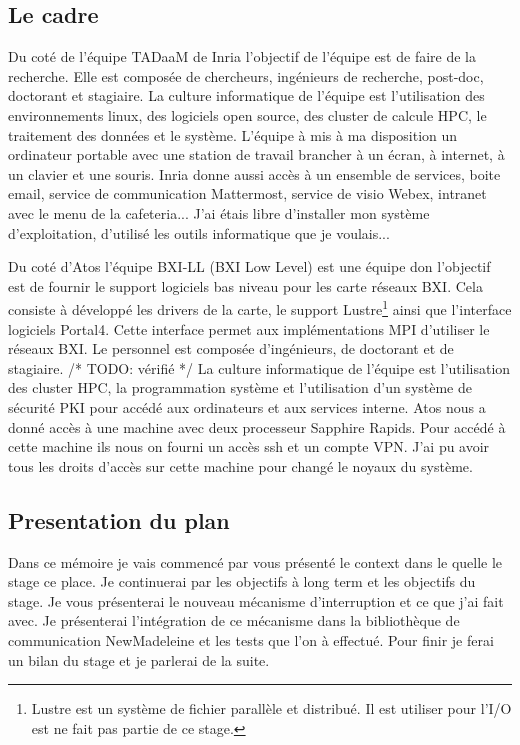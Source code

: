 \subsection{Le cadre}

Du coté de l'équipe TADaaM de Inria l'objectif de l'équipe est de faire de la recherche.
Elle est composée de chercheurs, ingénieurs de recherche, post-doc, doctorant et stagiaire.
La culture informatique de l'équipe est l'utilisation des environnements linux, des logiciels open source,
des cluster de calcule HPC, le traitement des données et le système.
L'équipe à mis à ma disposition un ordinateur portable avec une station de travail brancher à un écran, à internet, à un clavier et une souris.
Inria donne aussi accès à un ensemble de services, boite email, service de communication Mattermost, service de visio Webex, intranet avec le menu de la cafeteria...
J'ai étais libre d'installer mon système d'exploitation, d'utilisé les outils informatique que je voulais...

Du coté d'Atos l'équipe BXI-LL (BXI Low Level) est une équipe don l'objectif est de fournir le support logiciels bas niveau pour les carte réseaux BXI.
Cela consiste à développé les drivers de la carte, le support Lustre\footnote{Lustre est un système de fichier parallèle et distribué. Il est utiliser pour l'I/O est ne fait pas partie de ce stage.} ainsi que l'interface logiciels Portal4.
Cette interface permet aux implémentations MPI d'utiliser le réseaux BXI.
Le personnel est composée d'ingénieurs, de doctorant et de stagiaire. /* TODO: vérifié */
La culture informatique de l'équipe est l'utilisation des cluster HPC, la programmation système et l'utilisation d'un système de sécurité PKI pour accédé aux ordinateurs et aux services interne.
Atos nous a donné accès à une machine avec deux processeur \intel{} Sapphire Rapids.
Pour accédé à cette machine ils nous on fourni un accès ssh et un compte VPN.
J'ai pu avoir tous les droits d'accès sur cette machine pour changé le noyaux du système.

\subsection{Presentation du plan}

Dans ce mémoire je vais commencé par vous présenté le context dans le quelle le stage ce place.
Je continuerai par les objectifs à long term et les objectifs du stage.
Je vous présenterai le nouveau mécanisme d'interruption et ce que j'ai fait avec.
Je présenterai l'intégration de ce mécanisme dans la bibliothèque de communication NewMadeleine et les tests que l'on à effectué.
Pour finir je ferai un bilan du stage et je parlerai de la suite.
